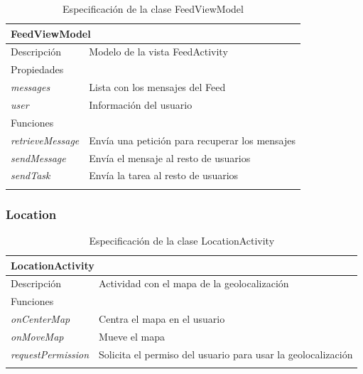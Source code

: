 \vspace{-22pt}
\begin{longtable}{|p{} p{}|}
    \hline
    \multicolumn{2}{|l|}{FeedViewModel} \\ \hline \hline
    Descripción      & Modelo de la vista FeedActivity \\ \hline
    \multicolumn{2}{|l|}{Propiedades} \\
    \emph{messages}  & Lista con los mensajes del Feed  \\
    \emph{user}  & Información del usuario  \\ \hline
    \multicolumn{2}{|l|}{Funciones} \\
    \emph{retrieveMessage}  & Envía una petición para recuperar los mensajes \\
    \emph{sendMessage}  & Envía el mensaje al resto de usuarios \\
    \emph{sendTask}  & Envía la tarea al resto de usuarios \\ \hline
    \caption{Especificación de la clase FeedViewModel}
    \label{class:app:feed_view_model}
\end{longtable}

\vspace{-32pt}
\subsubsection{Location}

\vspace{-7pt}
\begin{longtable}{|p{} p{}|}
    \hline
    \multicolumn{2}{|l|}{LocationActivity} \\ \hline \hline
    Descripción      & Actividad con el mapa de la geolocalización \\ \hline
    \multicolumn{2}{|l|}{Funciones} \\
    \emph{onCenterMap}  & Centra el mapa en el usuario  \\
    \emph{onMoveMap}  & Mueve el mapa  \\ 
    \emph{requestPermission}  & Solicita el permiso del usuario para usar la geolocalización  \\ \hline
    \caption{Especificación de la clase LocationActivity}
    \label{class:app:location_activity}
\end{longtable}

